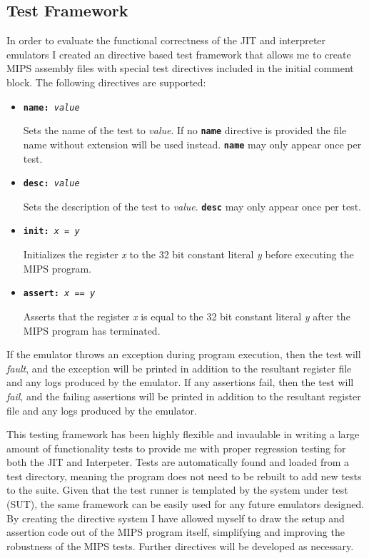 \subsection{Test Framework}

In order to evaluate the functional correctness of the JIT and interpreter emulators I created an directive based test framework that allows me to create MIPS assembly files with special test directives included in the initial comment block. The following directives are supported:

\begin{itemize}
    \item \texttt{\textbf{name:} \textit{value}}
    
    Sets the name of the test to \textit{value}. If no \texttt{\textbf{name}} directive is provided the file name without extension will be used instead. \texttt{\textbf{name}} may only appear once per test.

    \item \texttt{\textbf{desc:} \textit{value}}
    
    Sets the description of the test to \textit{value}. \texttt{\textbf{desc}} may only appear once per test.

    \item \texttt{\textbf{init:} \textit{x} = \textit{y}}
    
    Initializes the register \textit{x} to the 32 bit constant literal \textit{y} before executing the MIPS program.

    \item \texttt{\textbf{assert:} \textit{x} == \textit{y}}
    
    Asserts that the register \textit{x} is equal to the 32 bit constant literal \textit{y} after the MIPS program has terminated.
\end{itemize}

If the emulator throws an exception during program execution, then the test will \emph{fault}, and the exception will be printed in addition to the resultant register file and any logs produced by the emulator. If any assertions fail, then the test will \emph{fail}, and the failing assertions will be printed in addition to the resultant register file and any logs produced by the emulator.

This testing framework has been highly flexible and invaulable in writing a large amount of functionality tests to provide me with proper regression testing for both the JIT and Interpeter. Tests are automatically found and loaded from a test directory, meaning the program does not need to be rebuilt to add new tests to the suite. Given that the test runner is templated by the system under test (SUT), the same framework can be easily used for any future emulators designed. By creating the directive system I have allowed myself to draw the setup and assertion code out of the MIPS program itself, simplifying and improving the robustness of the MIPS tests. Further directives will be developed as necessary.

